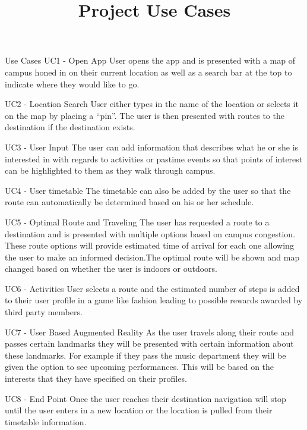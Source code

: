 \documentclass{table}
\title{Project Use Cases}
\begin{document}
	
	Use Cases
	UC1 - Open App
	User opens the app and is presented with a map of campus honed in on their current location as well as a search bar at the top to indicate where they would like to go.

	UC2 - Location Search
	User either types in the name of the location or selects it on the map by placing a “pin”. The user is then presented with routes to the destination if the destination exists.

	UC3 - User Input
	The user can add information that describes what he or she is interested in with regards to activities or pastime events so that points of interest can be highlighted to them as they walk through campus. 

	UC4 - User timetable
	The timetable can also be added by the user so that the route can automatically be determined based on his or her schedule.

	UC5 - Optimal Route and Traveling
	The user has requested a route to a destination and is presented with multiple options based on campus congestion. These route options will provide estimated time of arrival for each one allowing the user to make an informed decision.The optimal route will be shown and map changed based on whether the user is indoors or outdoors.

	UC6 - Activities
	User selects a route and the estimated number of steps is added to their user profile in a game like fashion leading to possible rewards awarded by third party members. 

	UC7 - User Based Augmented Reality 
	As the user travels along their route and passes certain landmarks they will be presented with certain information about these landmarks. For example if they pass the music department they will be given the option to see upcoming performances. This will be based on the interests that they have specified on their profiles. 

	UC8 - End Point
	Once the user reaches their destination navigation will stop until the user enters in a new location or the location is pulled from their timetable information.
\end{document}
